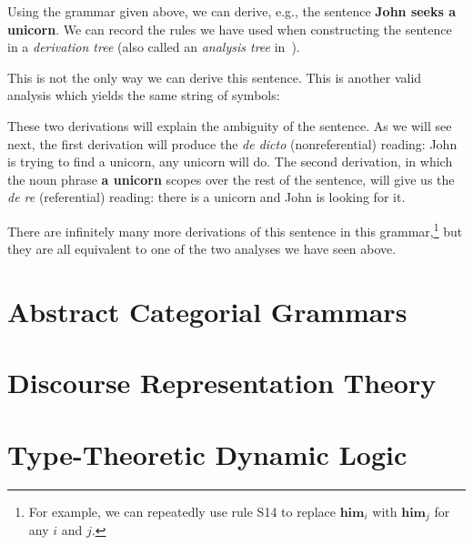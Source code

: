 Using the grammar given above, we can derive, e.g., the sentence
\textbf{John seeks a unicorn}. We can record the rules we have used when
constructing the sentence in a \emph{derivation tree} (also called an
\emph{analysis tree} in~\cite{montague1973proper}).

\begin{center}
\end{center}

This is not the only way we can derive this sentence. This is another valid
analysis which yields the same string of symbols:

\begin{center}
\end{center}

These two derivations will explain the ambiguity of the sentence. As we
will see next, the first derivation will produce the \emph{de dicto}
(nonreferential) reading: John is trying to find a unicorn, any unicorn
will do. The second derivation, in which the noun phrase \textbf{a unicorn}
scopes over the rest of the sentence, will give us the \emph{de re}
(referential) reading: there is a unicorn and John is looking for it.

There are infinitely many more derivations of this sentence in this
grammar,\footnote{For example, we can repeatedly use rule S14 to replace
  $\textbf{him}_i$ with $\textbf{him}_j$ for any $i$ and $j$.} but they are
all equivalent to one of the two analyses we have seen above.


\section{Abstract Categorial Grammars}
\label{sec:acg}




\section{Discourse Representation Theory}
\label{sec:drt}




\section{Type-Theoretic Dynamic Logic}
\label{sec:ttdl}
